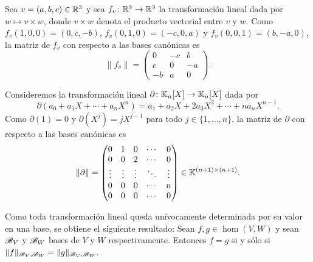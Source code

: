 \begin{example}
    Sea $v=(a,b,c)\in\mathbb{R}^3$ y sea $f_v\colon\mathbb{R}^3\to\mathbb{R}^3$ la transformación
    lineal dada por $w\mapsto v\times w$, donde $v\times w$ denota el producto
    vectorial entre $v$ y $w$. Como $f_v(1,0,0)=(0,c,-b)$,
    $f_v(0,1,0)=(-c,0,a)$ y $f_v(0,0,1)=(b,-a,0)$, la matriz de $f_v$ con
    respecto a las bases canónicas es
    \[
        \|f_v\|=
        \begin{pmatrix}
            0 & -c & b\\
            c & 0 & -a\\
            -b & a & 0
        \end{pmatrix}.
    \]
\end{example}

\begin{example}
    Consideremos la transformación lineal $\partial\colon\mathbb{K}_n[X]\to\mathbb{K}_{n}[X]$
    dada por 
    \[
        \partial(a_0+a_1X+\cdots+a_nX^n)=a_1+a_2X+2a_3X^2+\cdots+na_nX^{n-1}.
    \]
    Como $\partial(1)=0$ y $\partial(X^j)=jX^{j-1}$ para todo
    $j\in\{1,\dots,n\}$, la matriz de $\partial$ con respecto a las bases
    canónicas es
    \[
    \|\partial\|
    =
    \begin{pmatrix}
        0 & 1 & 0 & \cdots & 0\\
        0 & 0 & 2 & \cdots & 0\\
        \vdots & \vdots & \vdots & \ddots & \vdots\\
        0 & 0 & 0 & \cdots & n\\
        0 & 0 & 0 & \cdots & 0\\
    \end{pmatrix}\in\mathbb{K}^{(n+1)\times{(n+1)}}.
    \]
\end{example}

\begin{block}
    Como toda transformación lineal queda unívocamente determinada por su valor
    en una base, se obtiene el siguiente resultado: Sean $f,g\in\hom(V,W)$ y
    sean $\mathscr{B}_V$ y $\mathscr{B}_W$ bases de $V$ y $W$ respectivamente. Entonces $f=g$
    si y sólo si $\|f\|_{\mathscr{B}_V,\mathscr{B}_W}=\|g\|_{\mathscr{B}_V,\mathscr{B}_W}$. 
\end{block}

